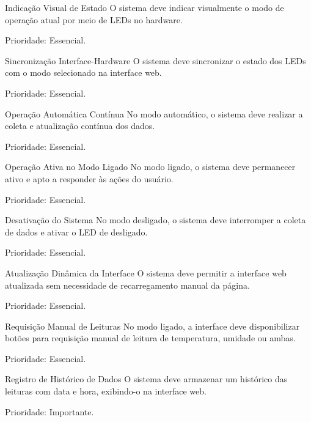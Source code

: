 \begin{rfreq}{Indicação Visual de Estado}
O sistema deve indicar visualmente o modo de operação atual por meio de LEDs no hardware.

Prioridade:  Essencial.
\end{rfreq}

\begin{rfreq}{Sincronização Interface-Hardware}
O sistema deve sincronizar o estado dos LEDs com o modo selecionado na interface web.

Prioridade:  Essencial.
\end{rfreq}

\begin{rfreq}{Operação Automática Contínua}
No modo automático, o sistema deve realizar a coleta e atualização contínua dos dados.

Prioridade:  Essencial.
\end{rfreq}

\begin{rfreq}{Operação Ativa no Modo Ligado}
No modo ligado, o sistema deve permanecer ativo e apto a responder às ações do usuário.

Prioridade:  Essencial.
\end{rfreq}

\begin{rfreq}{Desativação do Sistema}
No modo desligado, o sistema deve interromper a coleta de dados e ativar o LED de desligado.

Prioridade:  Essencial.
\end{rfreq}

\begin{rfreq}{Atualização Dinâmica da Interface}
O sistema deve permitir a interface web atualizada sem necessidade de recarregamento manual da página.

Prioridade: Essencial.
\end{rfreq}

\begin{rfreq}{Requisição Manual de Leituras}
No modo ligado, a interface deve disponibilizar botões para requisição manual de leitura de temperatura, umidade ou ambas.

Prioridade:  Essencial.
\end{rfreq}

\begin{rfreq}{Registro de Histórico de Dados}
O sistema deve armazenar um histórico das leituras com data e hora, exibindo-o na interface web.

Prioridade:  Importante.
\end{rfreq}

